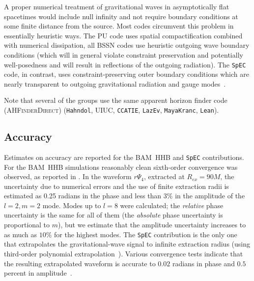 A proper numerical treatment of gravitational waves in asymptotically
flat spacetimes would include null infinity and not require boundary
conditions at some finite distance from the source.  Most codes
circumvent this problem in essentially heuristic ways. The PU code
uses spatial compactification combined with numerical dissipation, all
BSSN codes use heuristic outgoing wave boundary conditions (which will
in general violate constraint preservation and potentially
well-posedness and will result in reflections of the outgoing
radiation).  The {\tt SpEC} code, in contrast, uses
constraint-preserving outer boundary conditions which are nearly
transparent to outgoing gravitational radiation and gauge
modes~\cite{Rinne:2007ui}. 

Note that several of the groups use the same apparent horizon finder 
code (\textsc{AHFinderDirect})
\cite{Thornburg:1995cp,Thornburg:2003sf}
({\tt Hahndol}, UIUC, {\tt CCATIE}, {\tt LazEv}, {\tt MayaKranc}, {\tt Lean}). 


\subsection{Accuracy}
\label{ssec:accuracy}


Estimates on accuracy are reported for the BAM~HHB and {\tt SpEC}
contributions.  For the BAM~HHB simulations reasonably clean
sixth-order convergence was observed, as reported in
\cite{Hannam:2007ik,Hannam:2007wf}. In the waveform $r\Psi_4$,
extracted at $R_{ex} = 90M$, the uncertainty due to numerical errors
and the use of finite extraction radii is estimated as 0.25 radians in
the phase and less than 3\% in the amplitude of the $l=2,m=2$ mode.
Modes up to $l = 8$ were calculated; the {\it relative} phase
uncertainty is the same for all of them (the {\it absolute} phase
uncertainty is proportional to $m$), but we estimate that the
amplitude uncertainty increases to as much as $10\%$ for the highest
modes. 
%
The {\tt SpEC} contribution is the only one that extrapolates the
gravitational-wave signal to infinite extraction radius (using
third-order polynomial extrapolation~\cite{Boyle:2007ft}). Various
convergence tests indicate that the resulting extrapolated waveform is
accurate to $0.02$ radians in phase and $0.5$ percent in
amplitude~\cite{Boyle:2007ft}.
%

